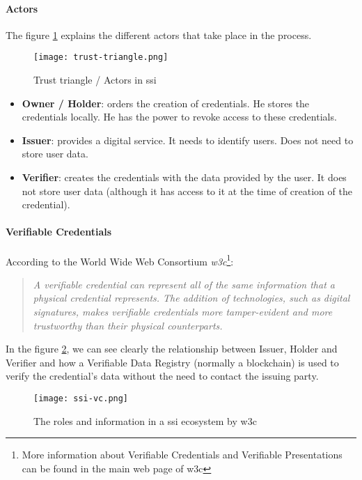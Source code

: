                 \paragraph{Actors}
                    The figure \ref{fig:trust-triangle} explains the different actors\cite{ssi-guide} that take place in the process.
                    \begin{figure}[h]
                        \centering
                        \texttt{[image: trust-triangle.png]}
                        \caption{Trust triangle / Actors in \acrshort{ssi}}
                        \label{fig:trust-triangle}
                    \end{figure}
                    \begin{itemize}
                        \item \textbf{Owner / Holder}: orders the creation of credentials. He stores the credentials locally. He has the power to revoke access to these credentials.
                        \item \textbf{Issuer}: provides a digital service. It needs to identify users. Does not need to store user data.
                        \item \textbf{Verifier}: creates the credentials with the data provided by the user. It does not store user data (although it has access to it at the time of creation of the credential).
                    \end{itemize}
            
                \paragraph{Verifiable Credentials}
                    According to the World Wide Web Consortium \textit{\acrshort{w3c}}\cite{w3c-vc}\footnote{\label{footnote-w3c}More information about Verifiable Credentials and Verifiable Presentations can be found in the main web page of \acrshort{w3c}\cite{w3c-vc}}:
                    \begin{quote}
                        \textit{A verifiable credential can represent all of the same information that a physical credential represents. The addition of technologies, such as digital signatures, makes verifiable credentials more tamper-evident and more trustworthy than their physical counterparts.}
                    \end{quote}
                    In the figure \ref{fig:ssi-vc}, we can see clearly the relationship between Issuer, Holder and Verifier and how a Verifiable Data Registry (normally a blockchain) is used to verify the credential's data without the need to contact the issuing party.
                    \begin{figure}[h]
                        \centering
                        \texttt{[image: ssi-vc.png]}
                        \caption{The roles and information in a \acrshort{ssi} ecosystem by \acrshort{w3c}}
                        \label{fig:ssi-vc}
                    \end{figure}
                

